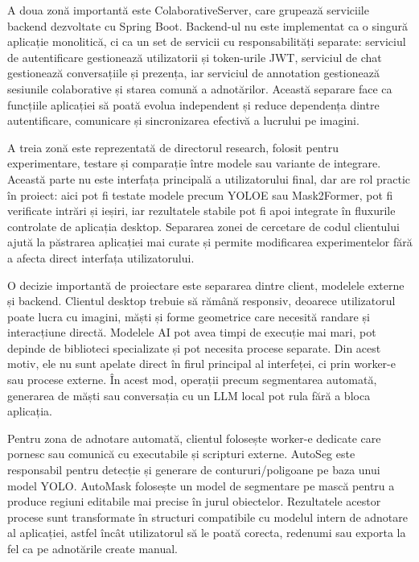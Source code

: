 A doua zonă importantă este ColaborativeServer, care grupează serviciile backend dezvoltate cu Spring Boot. Backend-ul nu este implementat ca o singură aplicație monolitică, ci ca un set de servicii cu responsabilități separate: serviciul de autentificare gestionează utilizatorii și token-urile JWT, serviciul de chat gestionează conversațiile și prezența, iar serviciul de annotation gestionează sesiunile colaborative și starea comună a adnotărilor. Această separare face ca funcțiile aplicației să poată evolua independent și reduce dependența dintre autentificare, comunicare și sincronizarea efectivă a lucrului pe imagini.

A treia zonă este reprezentată de directorul research, folosit pentru experimentare, testare și comparație între modele sau variante de integrare. Această parte nu este interfața principală a utilizatorului final, dar are rol practic în proiect: aici pot fi testate modele precum YOLOE sau Mask2Former, pot fi verificate intrări și ieșiri, iar rezultatele stabile pot fi apoi integrate în fluxurile controlate de aplicația desktop. Separarea zonei de cercetare de codul clientului ajută la păstrarea aplicației mai curate și permite modificarea experimentelor fără a afecta direct interfața utilizatorului.

O decizie importantă de proiectare este separarea dintre client, modelele externe și backend. Clientul desktop trebuie să rămână responsiv, deoarece utilizatorul poate lucra cu imagini, măști și forme geometrice care necesită randare și interacțiune directă. Modelele AI pot avea timpi de execuție mai mari, pot depinde de biblioteci specializate și pot necesita procese separate. Din acest motiv, ele nu sunt apelate direct în firul principal al interfeței, ci prin worker-e sau procese externe. În acest mod, operații precum segmentarea automată, generarea de măști sau conversația cu un LLM local pot rula fără a bloca aplicația.

Pentru zona de adnotare automată, clientul folosește worker-e dedicate care pornesc sau comunică cu executabile și scripturi externe. AutoSeg este responsabil pentru detecție și generare de contururi/poligoane pe baza unui model YOLO.
AutoMask folosește un model de segmentare pe mască pentru a produce regiuni editabile mai precise în jurul obiectelor. Rezultatele acestor procese sunt transformate în structuri compatibile cu modelul intern de adnotare al aplicației, astfel încât utilizatorul să le poată corecta, redenumi sau exporta la fel ca pe adnotările create manual.


